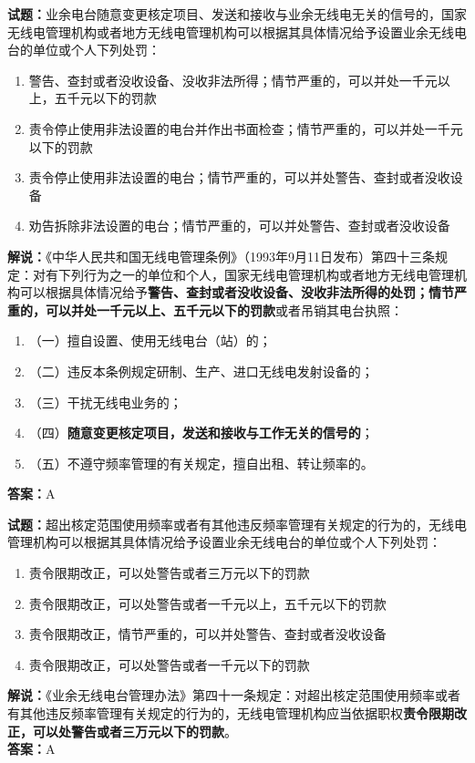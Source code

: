 \documentclass{ctexbook}
\begin{document}
\noindent\textbf{试题：}业余电台随意变更核定项目、发送和接收与业余无线电无关的信号的，国家无线电管理机构或者地方无线电管理机构可以根据其具体情况给予设置业余无线电台的单位或个人下列处罚：
\begin{enumerate}[leftmargin=3em]
\item 警告、查封或者没收设备、没收非法所得；情节严重的，可以并处一千元以上，五千元以下的罚款
\item 责令停止使用非法设置的电台并作出书面检查；情节严重的，可以并处一千元以下的罚款
\item 责令停止使用非法设置的电台；情节严重的，可以并处警告、查封或者没收设备
\item 劝告拆除非法设置的电台；情节严重的，可以并处警告、查封或者没收设备
\end{enumerate}
\noindent\textbf{解说：}《中华人民共和国无线电管理条例》（1993年9月11日发布）第四十三条规定：对有下列行为之一的单位和个人，国家无线电管理机构或者地方无线电管理机构可以根据具体情况给予\textbf{警告、查封或者没收设备、没收非法所得的处罚；情节严重的，可以并处一千元以上、五千元以下的罚款}或者吊销其电台执照：
\begin{enumerate}[leftmargin=3em, label=]
	\item（一）擅自设置、使用无线电台（站）的；
	\item（二）违反本条例规定研制、生产、进口无线电发射设备的；
	\item（三）干扰无线电业务的；
	\item（四）\textbf{随意变更核定项目，发送和接收与工作无关的信号的}；
	\item（五）不遵守频率管理的有关规定，擅自出租、转让频率的。
\end{enumerate}
\textbf{答案：}A



\bigskip


\noindent\textbf{试题：}超出核定范围使用频率或者有其他违反频率管理有关规定的行为的，无线电管理机构可以根据其具体情况给予设置业余无线电台的单位或个人下列处罚：
\begin{enumerate}[leftmargin=3em]
\item 责令限期改正，可以处警告或者三万元以下的罚款
\item 责令限期改正，可以处警告或者一千元以上，五千元以下的罚款
\item 责令限期改正，情节严重的，可以并处警告、查封或者没收设备
\item 责令限期改正，可以处警告或者一千元以下的罚款
\end{enumerate}
\noindent\textbf{解说：}《业余无线电台管理办法》第四十一条规定：对超出核定范围使用频率或者有其他违反频率管理有关规定的行为的，无线电管理机构应当依据职权\textbf{责令限期改正，可以处警告或者三万元以下的罚款}。\\\textbf{答案：}A
\end{document}
